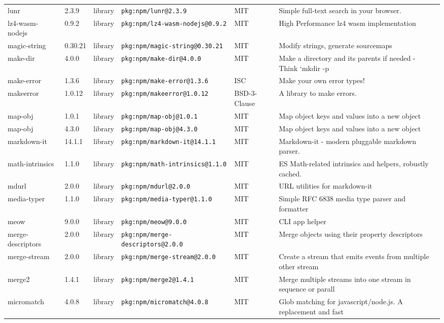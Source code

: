\documentclass[11pt]{article}
\begin{document}
\begin{longtable}{|l|l|l|p{2.2cm}|l|p{4cm}|}
lunr & 2.3.9 & library & \texttt{pkg:npm/lunr@2.3.9} & MIT & Simple full-text search in your browser. \\
lz4-wasm-nodejs & 0.9.2 & library & \texttt{pkg:npm/lz4-wasm-nodejs@0.9.2} & MIT & High Performance lz4 wasm implementation \\
magic-string & 0.30.21 & library & \texttt{pkg:npm/magic-string@0.30.21} & MIT & Modify strings, generate sourcemaps \\
make-dir & 4.0.0 & library & \texttt{pkg:npm/make-dir@4.0.0} & MIT & Make a directory and its parents if needed - Think `mkdir -p \\
make-error & 1.3.6 & library & \texttt{pkg:npm/make-error@1.3.6} & ISC & Make your own error types! \\
makeerror & 1.0.12 & library & \texttt{pkg:npm/makeerror@1.0.12} & BSD-3-Clause & A library to make errors. \\
map-obj & 1.0.1 & library & \texttt{pkg:npm/map-obj@1.0.1} & MIT & Map object keys and values into a new object \\
map-obj & 4.3.0 & library & \texttt{pkg:npm/map-obj@4.3.0} & MIT & Map object keys and values into a new object \\
markdown-it & 14.1.1 & library & \texttt{pkg:npm/markdown-it@14.1.1} & MIT & Markdown-it - modern pluggable markdown parser. \\
math-intrinsics & 1.1.0 & library & \texttt{pkg:npm/math-intrinsics@1.1.0} & MIT & ES Math-related intrinsics and helpers, robustly cached. \\
mdurl & 2.0.0 & library & \texttt{pkg:npm/mdurl@2.0.0} & MIT & URL utilities for markdown-it \\
media-typer & 1.1.0 & library & \texttt{pkg:npm/media-typer@1.1.0} & MIT & Simple RFC 6838 media type parser and formatter \\
meow & 9.0.0 & library & \texttt{pkg:npm/meow@9.0.0} & MIT & CLI app helper \\
merge-descriptors & 2.0.0 & library & \texttt{pkg:npm/merge-descriptors@2.0.0} & MIT & Merge objects using their property descriptors \\
merge-stream & 2.0.0 & library & \texttt{pkg:npm/merge-stream@2.0.0} & MIT & Create a stream that emits events from multiple other stream \\
merge2 & 1.4.1 & library & \texttt{pkg:npm/merge2@1.4.1} & MIT & Merge multiple streams into one stream in sequence or parall \\
micromatch & 4.0.8 & library & \texttt{pkg:npm/micromatch@4.0.8} & MIT & Glob matching for javascript/node.js. A replacement and fast \\

\end{longtable}
\end{document}
